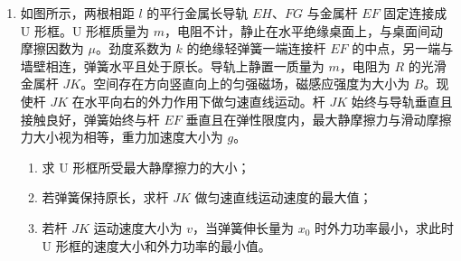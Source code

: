 \documentclass[\gkver]{gaokaozhenti}
\begin{document}
\begin{enumerate}
\item
如图所示，两根相距 $l$ 的平行金属长导轨 $EH$、$FG$ 与金属杆 $EF$ 固定连接成 U 形框。U 形框质量为 $m$，电阻不计，静止在水平绝缘桌面上，与桌面间动摩擦因数为 $\mu$。劲度系数为 $k$ 的绝缘轻弹簧一端连接杆 $EF$ 的中点，另一端与墙壁相连，弹簧水平且处于原长。导轨上静置一质量为 $m$，电阻为 $R$ 的光滑金属杆 $JK$。空间存在方向竖直向上的匀强磁场，磁感应强度为大小为 $B$。现使杆 $JK$ 在水平向右的外力作用下做匀速直线运动。杆 $JK$ 始终与导轨垂直且接触良好，弹簧始终与杆 $EF$ 垂直且在弹性限度内，最大静摩擦力与滑动摩擦力大小视为相等，重力加速度大小为 $g$。
\begin{enumerate}
\item
求 U 形框所受最大静摩擦力的大小；
\item
若弹簧保持原长，求杆 $JK$ 做匀速直线运动速度的最大值；
\item
若杆 $JK$ 运动速度大小为 $v$，当弹簧伸长量为 $x_{0}$ 时外力功率最小，求此时 U 形框的速度大小和外力功率的最小值。
\end{enumerate}


\end{enumerate}
\end{document}
